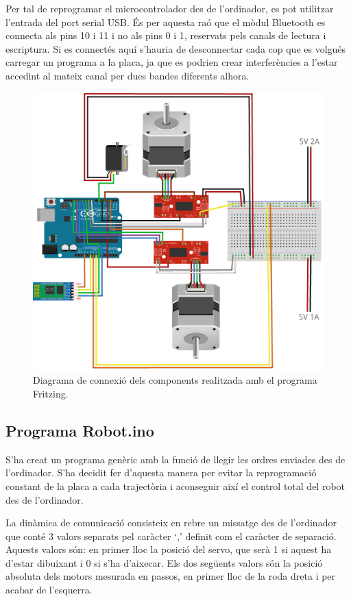 Per tal de reprogramar el microcontrolador des de l’ordinador, es pot utilitzar l’entrada del port serial USB. És per aquesta raó que el mòdul Bluetooth es connecta als pins 10 i 11 i no als pins 0 i 1, reservats pels canals de lectura i escriptura. Si es connectés aquí s’hauria de desconnectar cada cop que es volgués carregar un programa a la placa, ja que es podrien crear interferències a l'estar accedint al mateix canal per dues bandes diferents alhora. 
\begin{figure}[H]
	\centering
	\includegraphics[scale=0.5]{RobotFritz}
	\caption{Diagrama de connexió dels components realitzada amb el programa Fritzing.}
	\label{fig:connexio}
\end{figure}
\subsection{Programa Robot.ino}

S’ha creat un programa genèric amb la funció de llegir les ordres enviades des de l’ordinador. S’ha decidit fer d’aquesta manera per evitar la reprogramació constant de la placa a cada trajectòria i aconseguir així el control total del robot des de l’ordinador. 

La dinàmica de comunicació consisteix en rebre un missatge des de l’ordinador que conté 3 valors separats pel caràcter ‘,’ definit com el caràcter de separació. Aquests valors són: en primer lloc la posició del servo, que serà 1 si aquest ha d’estar dibuixant i 0 si s’ha d’aixecar. Els dos següents valors són la posició absoluta dels motors mesurada en passos, en primer lloc de la roda dreta i per acabar de l’esquerra. 

